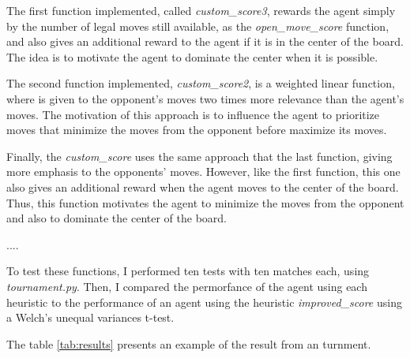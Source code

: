 \documentclass[a4paper]{article}
\begin{document}

The first function implemented, called \textit{custom\_score3}, rewards the agent simply by the number of legal moves still available, as the \textit{open\_move\_score} function, and also gives an additional reward to the agent if it is in the center of the board. The idea is to motivate the agent to dominate the center when it is possible.

The second function implemented, \textit{custom\_score2}, is a weighted linear function, where is given to the opponent's moves two times more relevance than the agent's moves. The motivation of this approach is to influence the agent to prioritize moves that minimize the moves from the opponent before maximize its moves.

Finally, the \textit{custom\_score} uses the same approach that the last function, giving more emphasis to the opponents' moves. However, like the first function, this one also gives an additional reward when the agent moves to the center of the board. Thus, this function motivates the agent to minimize the moves from the opponent and also to dominate the center of the board.



....

To test these functions, I performed ten tests with ten matches each, using \textit{tournament.py}. Then, I compared the permorfance of the agent using each heuristic to the performance of an agent using the heuristic \textit{improved\_score} using a Welch's unequal variances t-test.




The table \ref{tab:results} presents an example of the result from an turnment.
\end{document}
